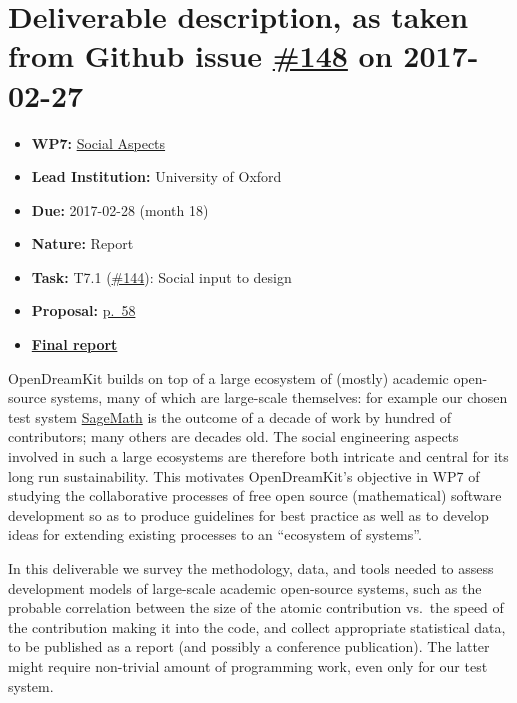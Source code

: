 \section*{\texorpdfstring{Deliverable description, as taken from Github
issue
\href{https://github.com/OpenDreamKit/OpenDreamKit/issues/148}{\#148} on
2017-02-27}{Deliverable description, as taken from Github issue \#148 on 2017-02-27}}\label{deliverable-description-as-taken-from-github-issue-148-on-2017-02-27}

\begin{itemize}
\tightlist
\item
  \textbf{WP7:}
  \href{https://github.com/OpenDreamKit/OpenDreamKit/tree/master/WP7}{Social
  Aspects}
\item
  \textbf{Lead Institution:} University of Oxford
\item
  \textbf{Due:} 2017-02-28 (month 18)
\item
  \textbf{Nature:} Report
\item
  \textbf{Task:} T7.1
  (\href{https://github.com/OpenDreamKit/OpenDreamKit/issues/144}{\#144}):
  Social input to design
\item
  \textbf{Proposal:}
  \href{https://github.com/OpenDreamKit/OpenDreamKit/raw/master/Proposal/proposal-www.pdf}{p.~58}
\item
  \textbf{\href{https://github.com/OpenDreamKit/OpenDreamKit/raw/master/WP7/D7.1/report-final.pdf}{Final
  report}}
\end{itemize}

OpenDreamKit builds on top of a large ecosystem of (mostly) academic
open-source systems, many of which are large-scale themselves: for
example our chosen test system \href{http://sagemath.org}{SageMath} is
the outcome of a decade of work by hundred of contributors; many others
are decades old. The social engineering aspects involved in such a large
ecosystems are therefore both intricate and central for its long run
sustainability. This motivates OpenDreamKit's objective in WP7 of
studying the collaborative processes of free open source (mathematical)
software development so as to produce guidelines for best practice as
well as to develop ideas for extending existing processes to an
``ecosystem of systems''.

In this deliverable we survey the methodology, data, and tools needed to
assess development models of large-scale academic open-source systems,
such as the probable correlation between the size of the atomic
contribution vs.~the speed of the contribution making it into the code,
and collect appropriate statistical data, to be published as a report
(and possibly a conference publication). The latter might require
non-trivial amount of programming work, even only for our test system.


